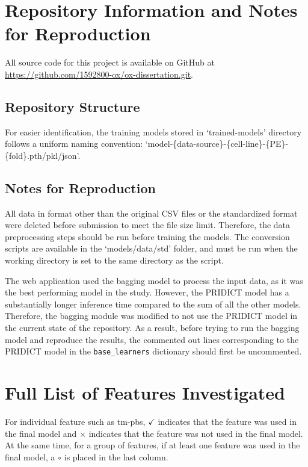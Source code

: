 \chapter{Repository Information and Notes for Reproduction}
\label{appendix:repository}

All source code for this project is available on GitHub at \url{https://github.com/1592800-ox/ox-dissertation.git}. 

\section{Repository Structure}

For easier identification, the training models stored in `trained-models' directory follows a uniform naming convention: `model-\{data-source\}-\{cell-line\}-\{PE\}-\{fold\}.pth/pkl/json'. 

\section{Notes for Reproduction}

All data in format other than the original CSV files or the standardized format were deleted before submission to meet the file size limit. Therefore, the data preprocessing steps should be run before training the models. The conversion scripts are available in the `models/data/std' folder, and must be run when the working directory is set to the same directory as the script.

The web application used the bagging model to process the input data, as it was the best performing model in the study. However, the PRIDICT model has a substantially longer inference time compared to the sum of all the other models. Therefore, the bagging module was modified to not use the PRIDICT model in the current state of the repository. As a result, before trying to run the bagging model and reproduce the results, the commented out lines corresponding to the PRIDICT model in the \verb|base_learners| dictionary should first be uncommented.


\chapter{Full List of Features Investigated}
\label{appendix:features}

For individual feature such as tm-pbs, $\checkmark$ indicates that the feature was used in the final model and $\times$ indicates that the feature was not used in the final model. At the same time, for a group of features, if at least one feature was used in the final model, a $\circ$ is placed in the last column. 

